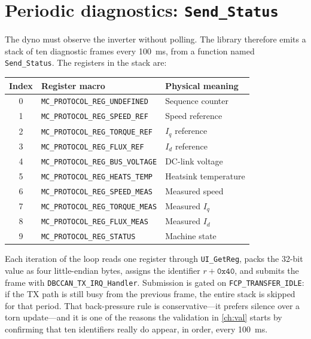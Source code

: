 \section{Periodic diagnostics: \texttt{Send\_Status}}
\label{sec:send-status}

The dyno must observe the inverter without polling. The library therefore
emits a stack of ten diagnostic frames every \SI{100}{\milli\second}, from
a function named \texttt{Send\_Status}. The registers in the stack are:

\begin{center}
\begin{tabular}{cll}
\toprule
Index & Register macro & Physical meaning \\
\midrule
0 & \texttt{MC\_PROTOCOL\_REG\_UNDEFINED} & Sequence counter \\
1 & \texttt{MC\_PROTOCOL\_REG\_SPEED\_REF} & Speed reference \\
2 & \texttt{MC\_PROTOCOL\_REG\_TORQUE\_REF} & $I_q$ reference \\
3 & \texttt{MC\_PROTOCOL\_REG\_FLUX\_REF} & $I_d$ reference \\
4 & \texttt{MC\_PROTOCOL\_REG\_BUS\_VOLTAGE} & DC-link voltage \\
5 & \texttt{MC\_PROTOCOL\_REG\_HEATS\_TEMP} & Heatsink temperature \\
6 & \texttt{MC\_PROTOCOL\_REG\_SPEED\_MEAS} & Measured speed \\
7 & \texttt{MC\_PROTOCOL\_REG\_TORQUE\_MEAS} & Measured $I_q$ \\
8 & \texttt{MC\_PROTOCOL\_REG\_FLUX\_MEAS} & Measured $I_d$ \\
9 & \texttt{MC\_PROTOCOL\_REG\_STATUS} & Machine state \\
\bottomrule
\end{tabular}
\end{center}

Each iteration of the loop reads one register through
\texttt{UI\_GetReg}, packs the 32-bit value as four little-endian bytes,
assigns the identifier $r + \mathtt{0x40}$, and submits the frame with
\texttt{DBCCAN\_TX\_IRQ\_Handler}. Submission is gated on
\texttt{FCP\_TRANSFER\_IDLE}: if the TX path is still busy from the
previous frame, the entire stack is skipped for that period. That
back-pressure rule is conservative---it prefers silence over a torn
update---and it is one of the reasons the validation in \cref{ch:val}
starts by confirming that ten identifiers really do appear, in order,
every \SI{100}{\milli\second}.

